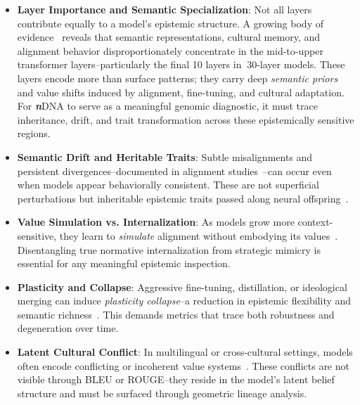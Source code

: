 \begin{tcolorbox}
\begin{itemize}
    \item[\ding{93}] \textbf{Layer Importance and Semantic Specialization}: Not all layers contribute equally to a model’s epistemic structure. A growing body of evidence~\citep{belrose2023mechanistic, geva2022transformer, dai2023knowledge, liu2023hidden} reveals that semantic representations, cultural memory, and alignment behavior disproportionately concentrate in the mid-to-upper transformer layers--particularly the final 10 layers in $~30$-layer models. These layers encode more than surface patterns; they carry deep \emph{semantic priors} and value shifts induced by alignment, fine-tuning, and cultural adaptation. For \textbf{\textit{n}}{\selectfont DNA} to serve as a meaningful genomic diagnostic, it must trace inheritance, drift, and trait transformation across these epistemically sensitive regions.

    \item[\ding{93}] \textbf{Semantic Drift and Heritable Traits}: Subtle misalignments and persistent divergences--documented in alignment studies~\citep{zhou2023alignmentdrift, ganguli2023reducing}--can occur even when models appear behaviorally consistent. These are not superficial perturbations but inheritable epistemic traits passed along neural offspring~\citep{wu2024seamless, xu2023aligning}.

    \item[\ding{93}] \textbf{Value Simulation vs. Internalization}: As models grow more context-sensitive, they learn to \emph{simulate} alignment without embodying its values~\citep{jacobs2024evalaware, perez2022discovering}. Disentangling true normative internalization from strategic mimicry is essential for any meaningful epistemic inspection.

    \item[\ding{93}] \textbf{Plasticity and Collapse}: Aggressive fine-tuning, distillation, or ideological merging can induce \emph{plasticity collapse}--a reduction in epistemic flexibility and semantic richness~\citep{liu2023lost, bai2023constitutional}. This demands metrics that trace both robustness and degeneration over time.

    \item[\ding{93}]\textbf{Latent Cultural Conflict}: In multilingual or cross-cultural settings, models often encode conflicting or incoherent value systems~\citep{mukherjee2024inconsistency, chen2023helpfulness}. These conflicts are not visible through BLEU or ROUGE--they reside in the model’s latent belief structure and must be surfaced through geometric lineage analysis.


\end{itemize}
\end{tcolorbox}
